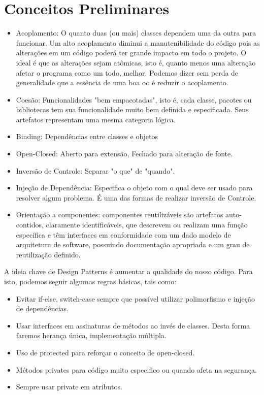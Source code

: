 \section{Conceitos Preliminares}
\begin{itemize}
	\item Acoplamento: O quanto duas (ou mais) classes dependem uma da outra para funcionar. Um alto acoplamento diminui a manutenibilidade do código pois as alterações em um código poderá ter grande impacto em todo o projeto. O ideal é que as alterações sejam atômicas, isto é, quanto menos uma alteração afetar o programa como um todo, melhor. Podemos dizer sem perda de generalidade que a essência de uma boa \gls{oo} é reduzir o acoplamento.
	\item Coesão: Funcionalidades "bem empacotadas", isto é, cada classe, pacotes ou bibliotecas tem sua funcionalidade muito bem definida e especificada. Seus artefatos representam uma mesma categoria lógica.
	\item Binding: Dependências entre classes e objetos
	\item Open-Closed: Aberto para extensão, Fechado para alteração de fonte.
	\item Inversão de Controle: Separar "o que" de "quando".
	\item Injeção de Dependência: Especifica o objeto com o qual deve ser usado para resolver algum problema. É uma das formas de realizar inversão de Controle.
	\item Orientação a componentes: componentes reutilizáveis são artefatos auto-contidos, claramente identificáveis, que descrevem ou realizam uma função específica e têm interfaces em conformidade com um dado modelo de arquitetura de software, possuindo documentação apropriada e um grau de reutilização definido\cite{werner00}.
\end{itemize}
A ideia chave de Design Patterns é aumentar a qualidade do nosso código. Para isto, podemos seguir algumas regras básicas, tais como:
\begin{itemize}
	
	\item Evitar if-else, switch-case sempre que possível utilizar polimorfismo e injeção de dependências.
	
	\item Usar interfaces em assinaturas de métodos ao invés de classes. Desta forma faremos herança única, implementação múltipla.
	
	\item Uso de protected para reforçar o conceito de open-closed.
	
	\item Métodos privates para código muito especifico ou quando afeta na segurança.
	
	\item Sempre usar private em atributos.
\end{itemize}


